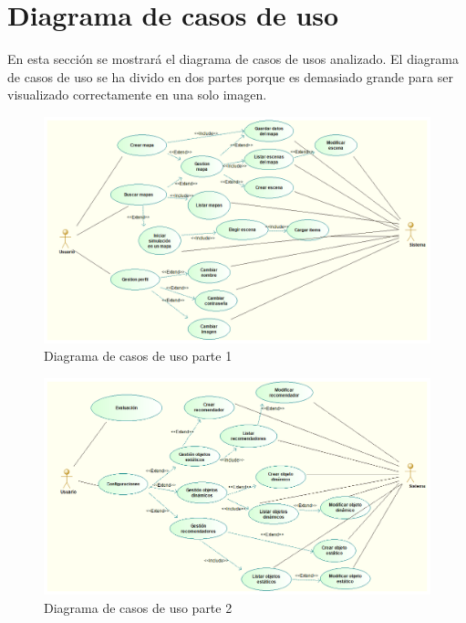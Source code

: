 \newpage

\section{Diagrama de casos de uso}

En esta sección se mostrará el diagrama de casos de usos analizado. El diagrama de casos de uso se ha divido en dos partes porque es demasiado grande para ser visualizado correctamente en una solo imagen.

\begin{figure}[H]
	\centering\includegraphics[scale=0.35]{imagenes/casos-de-uso-1.png}
	\caption{Diagrama de casos de uso parte 1}
	\label{img:casosDeUso1}
\end{figure}

\begin{figure}[H]
	\centering\includegraphics[scale=0.35]{imagenes/casos-de-uso-2.png}
	\caption{Diagrama de casos de uso parte 2}
	\label{img:casosDeUso2}
\end{figure}

